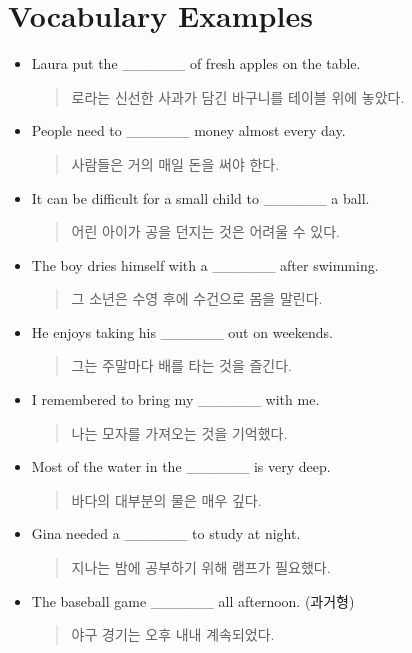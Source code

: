 \documentclass{article}
\begin{document}
\section*{Vocabulary Examples}
\begin{addmargin}[1em]{1em}
\begin{itemize}
    \item Laura put the \_\_\_\_\_\_ of fresh apples on the table.
    \begin{quote}
    로라는 신선한 사과가 담긴 바구니를 테이블 위에 놓았다.
    \end{quote}
    \item People need to \_\_\_\_\_\_ money almost every day.
    \begin{quote}
    사람들은 거의 매일 돈을 써야 한다.
    \end{quote}
    \item It can be difficult for a small child to \_\_\_\_\_\_ a ball.
    \begin{quote}
    어린 아이가 공을 던지는 것은 어려울 수 있다.
    \end{quote}
    \item The boy dries himself with a \_\_\_\_\_\_ after swimming.
    \begin{quote}
    그 소년은 수영 후에 수건으로 몸을 말린다.
    \end{quote}
    \item He enjoys taking his \_\_\_\_\_\_ out on weekends.
    \begin{quote}
    그는 주말마다 배를 타는 것을 즐긴다.
    \end{quote}
    \item I remembered to bring my \_\_\_\_\_\_ with me.
    \begin{quote}
    나는 모자를 가져오는 것을 기억했다.
    \end{quote}
    \item Most of the water in the \_\_\_\_\_\_ is very deep.
    \begin{quote}
    바다의 대부분의 물은 매우 깊다.
    \end{quote}
    \item Gina needed a \_\_\_\_\_\_ to study at night.
    \begin{quote}
    지나는 밤에 공부하기 위해 램프가 필요했다.
    \end{quote}
    \item The baseball game \_\_\_\_\_\_ all afternoon. (과거형)
    \begin{quote}
    야구 경기는 오후 내내 계속되었다.

\end{quote}
\end{itemize}
\end{addmargin}
\end{document}
